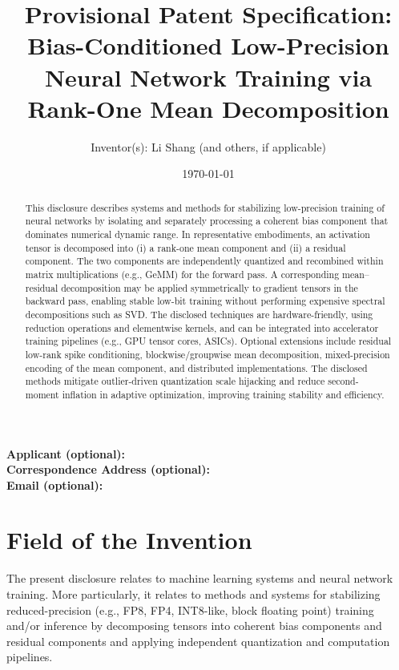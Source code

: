 \documentclass[11pt]{article}
\title{\bf Provisional Patent Specification:\\
Bias-Conditioned Low-Precision Neural Network Training via Rank-One Mean Decomposition}
\author{Inventor(s): Li Shang \;\; (and others, if applicable)}
\date{\today}
\begin{document}
\maketitle

\vspace{-0.5em}
\noindent\textbf{Applicant (optional):} \underline{\hspace{0.7\linewidth}}\\
\textbf{Correspondence Address (optional):} \underline{\hspace{0.62\linewidth}}\\
\textbf{Email (optional):} \underline{\hspace{0.79\linewidth}}

\begin{abstract}
This disclosure describes systems and methods for stabilizing low-precision training of neural networks by isolating and separately processing a coherent bias component that dominates numerical dynamic range. In representative embodiments, an activation tensor is decomposed into (i) a rank-one mean component and (ii) a residual component. The two components are independently quantized and recombined within matrix multiplications (e.g., GeMM) for the forward pass. A corresponding mean--residual decomposition may be applied symmetrically to gradient tensors in the backward pass, enabling stable low-bit training without performing expensive spectral decompositions such as SVD. The disclosed techniques are hardware-friendly, using reduction operations and elementwise kernels, and can be integrated into accelerator training pipelines (e.g., GPU tensor cores, ASICs). Optional extensions include residual low-rank spike conditioning, blockwise/groupwise mean decomposition, mixed-precision encoding of the mean component, and distributed implementations. The disclosed methods mitigate outlier-driven quantization scale hijacking and reduce second-moment inflation in adaptive optimization, improving training stability and efficiency.
\end{abstract}

\tableofcontents
\newpage

\section{Field of the Invention}
The present disclosure relates to machine learning systems and neural network training. More particularly, it relates to methods and systems for stabilizing reduced-precision (e.g., FP8, FP4, INT8-like, block floating point) training and/or inference by decomposing tensors into coherent bias components and residual components and applying independent quantization and computation pipelines.
\end{document}
